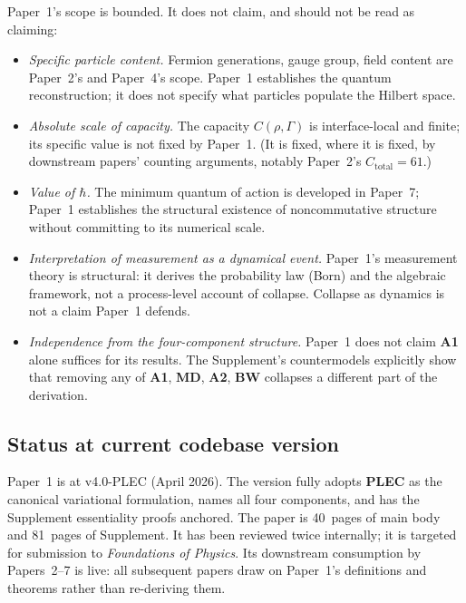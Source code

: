 \documentclass[11pt]{article}
\newcommand{\Aone}{\textbf{A1}}
\newcommand{\PLEC}{\textbf{PLEC}}
\begin{document}
Paper~1's scope is bounded. It does not claim, and should not be read as claiming:

\begin{itemize}
    \item \emph{Specific particle content.} Fermion generations, gauge group, field content are Paper~2's and Paper~4's scope. Paper~1 establishes the quantum reconstruction; it does not specify what particles populate the Hilbert space.
    \item \emph{Absolute scale of capacity.} The capacity $C(\rho, \Gamma)$ is interface-local and finite; its specific value is not fixed by Paper~1. (It is fixed, where it is fixed, by downstream papers' counting arguments, notably Paper~2's $C_{\mathrm{total}} = 61$.)
    \item \emph{Value of $\hbar$.} The minimum quantum of action is developed in Paper~7; Paper~1 establishes the structural existence of noncommutative structure without committing to its numerical scale.
    \item \emph{Interpretation of measurement as a dynamical event.} Paper~1's measurement theory is structural: it derives the probability law (Born) and the algebraic framework, not a process-level account of collapse. Collapse as dynamics is not a claim Paper~1 defends.
    \item \emph{Independence from the four-component structure.} Paper~1 does not claim \Aone{} alone suffices for its results. The Supplement's countermodels explicitly show that removing any of \Aone{}, \textbf{MD}, \textbf{A2}, \textbf{BW} collapses a different part of the derivation.
\end{itemize}

\subsection{Status at current codebase version}\label{sec:P1_status}

Paper~1 is at v4.0-PLEC (April 2026). The version fully adopts \PLEC{} as the canonical variational formulation, names all four components, and has the Supplement essentiality proofs anchored. The paper is 40~pages of main body and 81~pages of Supplement. It has been reviewed twice internally; it is targeted for submission to \emph{Foundations of Physics}. Its downstream consumption by Papers~2--7 is live: all subsequent papers draw on Paper~1's definitions and theorems rather than re-deriving them.

\clearpage
\end{document}
